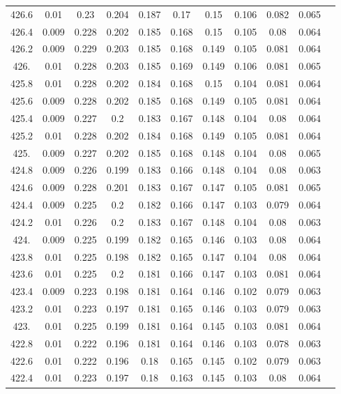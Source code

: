 \documentclass[12pt]{ctexart}
\numberwithin{equation}{section}
\begin{document}
\begin{longtable}{ccccccccccc}
426.6	&	0.01	&	0.23	&	0.204	&	0.187	&	0.17	&	0.15	&	0.106	&	0.082	&	0.065	\\
426.4	&	0.009	&	0.228	&	0.202	&	0.185	&	0.168	&	0.15	&	0.105	&	0.08	&	0.064	\\
426.2	&	0.009	&	0.229	&	0.203	&	0.185	&	0.168	&	0.149	&	0.105	&	0.081	&	0.064	\\
426.	&	0.01	&	0.228	&	0.203	&	0.185	&	0.169	&	0.149	&	0.106	&	0.081	&	0.065	\\
425.8	&	0.01	&	0.228	&	0.202	&	0.184	&	0.168	&	0.15	&	0.104	&	0.081	&	0.064	\\
425.6	&	0.009	&	0.228	&	0.202	&	0.185	&	0.168	&	0.149	&	0.105	&	0.081	&	0.064	\\
425.4	&	0.009	&	0.227	&	0.2	&	0.183	&	0.167	&	0.148	&	0.104	&	0.08	&	0.064	\\
425.2	&	0.01	&	0.228	&	0.202	&	0.184	&	0.168	&	0.149	&	0.105	&	0.081	&	0.064	\\
425.	&	0.009	&	0.227	&	0.202	&	0.185	&	0.168	&	0.148	&	0.104	&	0.08	&	0.065	\\
424.8	&	0.009	&	0.226	&	0.199	&	0.183	&	0.166	&	0.148	&	0.104	&	0.08	&	0.063	\\
424.6	&	0.009	&	0.228	&	0.201	&	0.183	&	0.167	&	0.147	&	0.105	&	0.081	&	0.065	\\
424.4	&	0.009	&	0.225	&	0.2	&	0.182	&	0.166	&	0.147	&	0.103	&	0.079	&	0.064	\\
424.2	&	0.01	&	0.226	&	0.2	&	0.183	&	0.167	&	0.148	&	0.104	&	0.08	&	0.063	\\
424.	&	0.009	&	0.225	&	0.199	&	0.182	&	0.165	&	0.146	&	0.103	&	0.08	&	0.064	\\
423.8	&	0.01	&	0.225	&	0.198	&	0.182	&	0.165	&	0.147	&	0.104	&	0.08	&	0.064	\\
423.6	&	0.01	&	0.225	&	0.2	&	0.181	&	0.166	&	0.147	&	0.103	&	0.081	&	0.064	\\
423.4	&	0.009	&	0.223	&	0.198	&	0.181	&	0.164	&	0.146	&	0.102	&	0.079	&	0.063	\\
423.2	&	0.01	&	0.223	&	0.197	&	0.181	&	0.165	&	0.146	&	0.103	&	0.079	&	0.063	\\
423.	&	0.01	&	0.225	&	0.199	&	0.181	&	0.164	&	0.145	&	0.103	&	0.081	&	0.064	\\
422.8	&	0.01	&	0.222	&	0.196	&	0.181	&	0.164	&	0.146	&	0.103	&	0.078	&	0.063	\\
422.6	&	0.01	&	0.222	&	0.196	&	0.18	&	0.165	&	0.145	&	0.102	&	0.079	&	0.063	\\
422.4	&	0.01	&	0.223	&	0.197	&	0.18	&	0.163	&	0.145	&	0.103	&	0.08	&	0.064	\\

\end{longtable}
\end{document}
